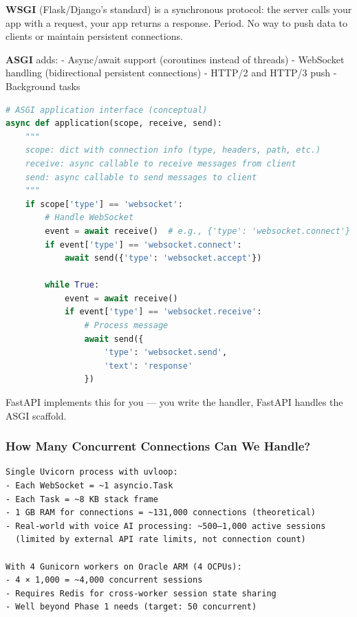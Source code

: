 \documentclass[
  11pt,
]{article}
\begin{document}
\textbf{WSGI} (Flask/Django's standard) is a synchronous protocol: the
server calls your app with a request, your app returns a response.
Period. No way to push data to clients or maintain persistent
connections.

\textbf{ASGI} adds: - Async/await support (coroutines instead of
threads) - WebSocket handling (bidirectional persistent connections) -
HTTP/2 and HTTP/3 push - Background tasks

\begin{lstlisting}[language=Python]
# ASGI application interface (conceptual)
async def application(scope, receive, send):
    """
    scope: dict with connection info (type, headers, path, etc.)
    receive: async callable to receive messages from client
    send: async callable to send messages to client
    """
    if scope['type'] == 'websocket':
        # Handle WebSocket
        event = await receive()  # e.g., {'type': 'websocket.connect'}
        if event['type'] == 'websocket.connect':
            await send({'type': 'websocket.accept'})
        
        while True:
            event = await receive()
            if event['type'] == 'websocket.receive':
                # Process message
                await send({
                    'type': 'websocket.send',
                    'text': 'response'
                })
\end{lstlisting}

FastAPI implements this for you --- you write the handler, FastAPI
handles the ASGI scaffold.

\hypertarget{how-many-concurrent-connections-can-we-handle}{%
\subsubsection{How Many Concurrent Connections Can We
Handle?}\label{how-many-concurrent-connections-can-we-handle}}

\begin{lstlisting}
Single Uvicorn process with uvloop:
- Each WebSocket = ~1 asyncio.Task
- Each Task = ~8 KB stack frame
- 1 GB RAM for connections = ~131,000 connections (theoretical)
- Real-world with voice AI processing: ~500–1,000 active sessions
  (limited by external API rate limits, not connection count)

With 4 Gunicorn workers on Oracle ARM (4 OCPUs):
- 4 × 1,000 = ~4,000 concurrent sessions
- Requires Redis for cross-worker session state sharing
- Well beyond Phase 1 needs (target: 50 concurrent)
\end{lstlisting}
\end{document}
